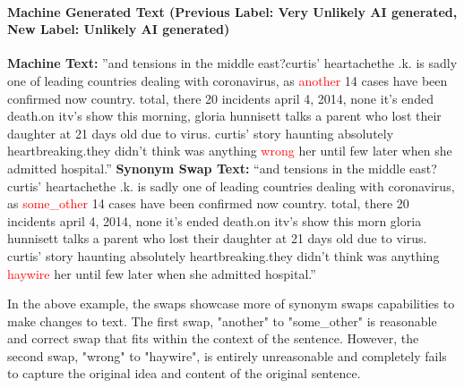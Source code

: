 \documentclass{article}
\begin{document}
\paragraph{Machine Generated Text (Previous Label: Very Unlikely AI generated, New Label: Unlikely AI generated)}
\hfill \break \textbf{Machine Text:} ”and tensions in the middle east?curtis' heartachethe .k. is sadly one of leading countries dealing with coronavirus, as \textcolor{red}{another} 14 cases have been confirmed now country. total, there 20 incidents april 4, 2014, none it's ended death.on itv's show this morning, gloria hunnisett talks a parent who lost their daughter at 21 days old due to virus. curtis' story haunting absolutely heartbreaking.they didn't think was anything \textcolor{red}{wrong} her until few later when she admitted hospital.”
\hfill \break \textbf{Synonym Swap Text:} “and tensions in the middle east?curtis' heartachethe .k. is sadly one of leading countries dealing with coronavirus, as \textcolor{red}{some\_other} 14 cases have been confirmed now country. total, there 20 incidents april 4, 2014, none it's ended death.on itv's show this morn gloria hunnisett talks a parent who lost their daughter at 21 days old due to virus. curtis' story haunting absolutely heartbreaking.they didn't think was anything \textcolor{red}{haywire} her until few later when she admitted hospital.”

In the above example, the swaps showcase more of synonym swaps capabilities to make changes to text. The first swap, "another" to "some\_other" is reasonable and correct swap that fits within the context of the sentence. However, the second swap, "wrong" to "haywire", is entirely unreasonable and completely fails to capture the original idea and content of the original sentence.
\end{document}
